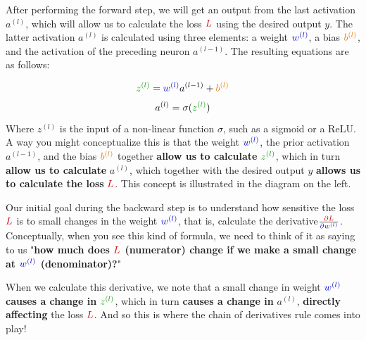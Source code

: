\begin{minipage}{0.55\textwidth}
After performing the forward step, we will get an output from the last activation \( a^{(l)} \), which will allow us to calculate the loss \( \textcolor{myred}{L} \) using the desired output \( y \). The latter activation \( a^{(l)} \) is calculated using three elements: a weight \( \textcolor{myblue}{w^{(l)}} \), a bias \( \textcolor{myorange}{b^{(l)}} \), and the activation of the preceding neuron \( a^{(l-1)} \). The resulting equations are as follows:

$$ \textcolor{mygreen}{z^{(l)}} = \textcolor{myblue}{w^{(l)}} a^{(l-1)} + \textcolor{myorange}{b^{(l)}} $$
$$ a^{(l)} = \sigma(\textcolor{mygreen}{z^{(l)}}) $$
Where \textcolor{mygreen}{$z^{(l)}$} is the input of a non-linear function $\sigma$, such as a sigmoid or a ReLU. \\

A way you might conceptualize this is that the weight \( \textcolor{myblue}{w^{(l)}} \), the prior activation \( a^{(l-1)} \), and the bias \( \textcolor{myorange}{b^{(l)}} \) together \textbf{\textcolor{myyellow!85!black}{allow us to calculate}} \( \textcolor{mygreen}{z^{(l)}} \), which in turn \textbf{\textcolor{myyellow!85!black}{allow us to calculate}} \( a^{(l)} \), which together with the desired output \( y \) \textbf{\textcolor{myyellow!85!black}{allows us to calculate the loss}} \( \textcolor{myred}{L} \). This concept is illustrated in the diagram on the left.
\end{minipage}

Our initial goal during the backward step is to understand how sensitive the loss \( \textcolor{myred}{L} \) is to small changes in the weight \( \textcolor{myblue}{w^{(l)}} \), that is, calculate the derivative\( \frac{\textcolor{myred}{\partial L}}{\textcolor{myblue}{\partial w^{(l)}}} \). 
Conceptually, when you see this kind of formula, we need to think of it as saying to us "\textbf{how much does \( \textcolor{myred}{L} \) (numerator) change if we make a small change at \( \textcolor{myblue}{w^{(l)}} \) (denominator)?}"

When we calculate this derivative, we note that a small change in weight \( \textcolor{myblue}{w^{(l)}}\) \textbf{\textcolor{myyellow!85!black}{causes a change in}} \( \textcolor{mygreen}{z^{(l)}} \), which in turn \textbf{\textcolor{myyellow!85!black}{causes a change in}} \( a^{(l)} \), \textbf{\textcolor{myyellow!85!black}{directly affecting}} the loss \( \textcolor{myred}{L} \). And so this is where the chain of derivatives rule comes into play! 

